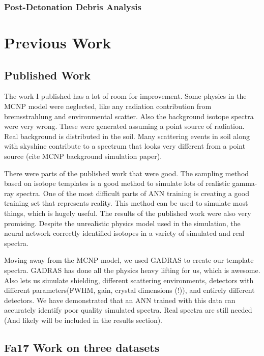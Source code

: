 \documentclass[thesis,tocnosub,noragright,centerchapter,12pt,fullpage]{uiucecethesis09}
\begin{document}
\subsection{Post-Detonation Debris Analysis}


\chapter{Previous Work}

\section{Published Work}

The work I published has a lot of room for improvement. Some physics in the MCNP model were neglected, like any radiation contribution from bremsstrahlung and environmental scatter. Also the background isotope spectra were very wrong. These were generated assuming a point source of radiation. Real background is distributed in the soil. Many scattering events in soil along with skyshine contribute to a spectrum that looks very different from a point source (cite MCNP background simulation paper). 

There were parts of the published work that were good. The sampling method based on isotope templates is a good method to simulate lots of realistic gamma-ray spectra. One of the most difficult parts of ANN training is creating a good training set that represents reality. This method can be used to simulate most things, which is hugely useful. The results of the published work were also very promising. Despite the unrealistic physics model used in the simulation, the neural network correctly identified isotopes in a variety of simulated and real spectra. 

Moving away from the MCNP model, we used GADRAS to create our template spectra. GADRAS has done all the physics heavy lifting for us, which is awesome. Also lets us simulate shielding, different scattering environments, detectors with different parameters(FWHM, gain, crystal dimensions (!)), and entirely different detectors. We have demonstrated that an ANN trained with this data can accurately identify poor quality simulated spectra. Real spectra are still needed (And likely will be included in the results section).

\section{Fa17 Work on three datasets}
\end{document}
